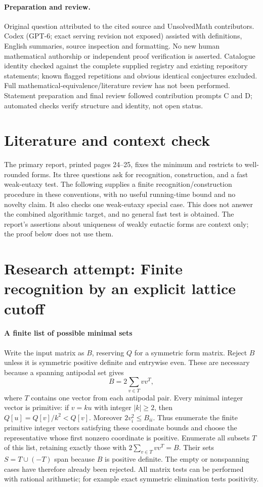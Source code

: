 \documentclass[11pt]{article}
\begin{document}
\paragraph{Preparation and review.}
Original question attributed to the cited source and UnsolvedMath contributors. Codex (GPT-6; exact serving revision not exposed) assisted with definitions, English summaries, source inspection and formatting. No new human mathematical authorship or independent proof verification is asserted. Catalogue identity checked against the complete supplied registry and existing repository statements; known flagged repetitions and obvious identical conjectures excluded. Full mathematical-equivalence/literature review has not been performed. Statement preparation and final review followed contribution prompts C and D; automated checks verify structure and identity, not open status.
\label{end:statement}

\section{Literature and context check}
The primary report, printed pages 24--25, fixes the minimum and restricts to well-rounded forms. Its three questions ask for recognition, construction, and a fast weak-eutaxy test. The following supplies a finite recognition/construction procedure in these conventions, with no useful running-time bound and no novelty claim. It also checks one weak-eutaxy special case. This does not answer the combined algorithmic target, and no general fast test is obtained. The report's assertions about uniqueness of weakly eutactic forms are context only; the proof below does not use them.
\section{Research attempt: Finite recognition by an explicit lattice cutoff}

\paragraph{A finite list of possible minimal sets}
Write the input matrix as $B$, reserving $Q$ for a symmetric form matrix. Reject $B$ unless it is symmetric positive definite and entrywise even. These are necessary because a spanning antipodal set gives
\[
 B=2\sum_{v\in T}vv^T,
\]
where $T$ contains one vector from each antipodal pair. Every minimal integer vector is primitive: if $v=ku$ with integer $|k|\geq2$, then $Q[u]=Q[v]/k^2<Q[v]$. Moreover $2v_i^2\leq B_{ii}$. Thus enumerate the finite primitive integer vectors satisfying these coordinate bounds and choose the representative whose first nonzero coordinate is positive. Enumerate all subsets $T$ of this list, retaining exactly those with $2\sum_{v\in T}vv^T=B$. Their sets $S=T\cup(-T)$ span because $B$ is positive definite. The empty or nonspanning cases have therefore already been rejected. All matrix tests can be performed with rational arithmetic; for example exact symmetric elimination tests positivity.
\end{document}
